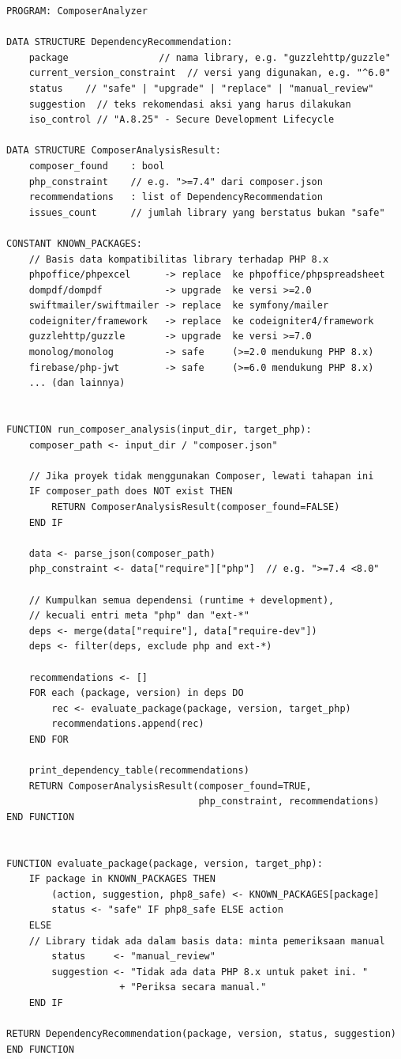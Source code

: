\begin{lstlisting}[style=pseudocodestyle]
PROGRAM: ComposerAnalyzer

DATA STRUCTURE DependencyRecommendation:
    package                // nama library, e.g. "guzzlehttp/guzzle"
    current_version_constraint  // versi yang digunakan, e.g. "^6.0"
    status    // "safe" | "upgrade" | "replace" | "manual_review"
    suggestion  // teks rekomendasi aksi yang harus dilakukan
    iso_control // "A.8.25" - Secure Development Lifecycle

DATA STRUCTURE ComposerAnalysisResult:
    composer_found    : bool
    php_constraint    // e.g. ">=7.4" dari composer.json
    recommendations   : list of DependencyRecommendation
    issues_count      // jumlah library yang berstatus bukan "safe"

CONSTANT KNOWN_PACKAGES:
    // Basis data kompatibilitas library terhadap PHP 8.x
    phpoffice/phpexcel      -> replace  ke phpoffice/phpspreadsheet
    dompdf/dompdf           -> upgrade  ke versi >=2.0
    swiftmailer/swiftmailer -> replace  ke symfony/mailer
    codeigniter/framework   -> replace  ke codeigniter4/framework
    guzzlehttp/guzzle       -> upgrade  ke versi >=7.0
    monolog/monolog         -> safe     (>=2.0 mendukung PHP 8.x)
    firebase/php-jwt        -> safe     (>=6.0 mendukung PHP 8.x)
    ... (dan lainnya)


FUNCTION run_composer_analysis(input_dir, target_php):
    composer_path <- input_dir / "composer.json"

    // Jika proyek tidak menggunakan Composer, lewati tahapan ini
    IF composer_path does NOT exist THEN
        RETURN ComposerAnalysisResult(composer_found=FALSE)
    END IF

    data <- parse_json(composer_path)
    php_constraint <- data["require"]["php"]  // e.g. ">=7.4 <8.0"

    // Kumpulkan semua dependensi (runtime + development),
    // kecuali entri meta "php" dan "ext-*"
    deps <- merge(data["require"], data["require-dev"])
    deps <- filter(deps, exclude php and ext-*)

    recommendations <- []
    FOR each (package, version) in deps DO
        rec <- evaluate_package(package, version, target_php)
        recommendations.append(rec)
    END FOR

    print_dependency_table(recommendations)
    RETURN ComposerAnalysisResult(composer_found=TRUE,
                                  php_constraint, recommendations)
END FUNCTION


FUNCTION evaluate_package(package, version, target_php):
    IF package in KNOWN_PACKAGES THEN
        (action, suggestion, php8_safe) <- KNOWN_PACKAGES[package]
        status <- "safe" IF php8_safe ELSE action
    ELSE
    // Library tidak ada dalam basis data: minta pemeriksaan manual
        status     <- "manual_review"
        suggestion <- "Tidak ada data PHP 8.x untuk paket ini. "
                    + "Periksa secara manual."
    END IF

RETURN DependencyRecommendation(package, version, status, suggestion)
END FUNCTION
\end{lstlisting}

